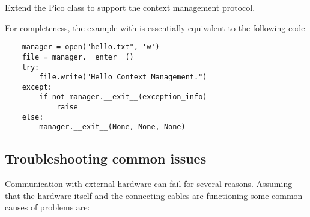 \begin{exercise}
    Extend the Pico class to support the context management protocol.
\end{exercise}

For completeness, the example with  is essentially equivalent to the following code
\begin{lstlisting}
    manager = open("hello.txt", 'w')
    file = manager.__enter__()
    try:
        file.write("Hello Context Management.")
    except:
        if not manager.__exit__(exception_info)
            raise
    else:
        manager.__exit__(None, None, None)
\end{lstlisting}

\subsection{Troubleshooting common issues}
Communication with external hardware can fail for several reasons. Assuming that the hardware itself and the connecting cables are functioning some common causes of problems are:
